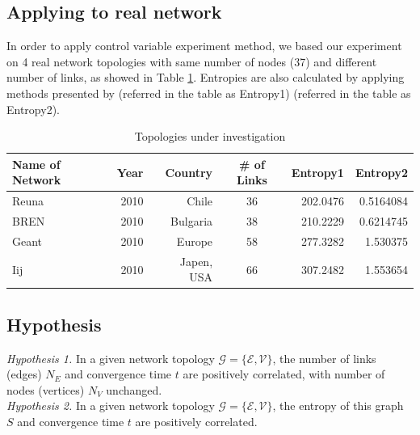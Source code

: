 \subsection{Applying to real network}
In order to apply control variable experiment method, we based our experiment on 4 real network topologies with same number of nodes (37) and different number of links, as showed in Table \ref{table: network}. Entropies are also calculated by applying methods presented by \cite{entropy1} (referred in the table as Entropy1) \cite{entropy2} (referred in the table as Entropy2).

\begin{table}
\centering
\begin{tabular}{lrrcrr}
	\hline
	Name of Network & Year & Country & \# of Links & Entropy1 & Entropy2\\
    \hline
    Reuna & 2010 & Chile & 36 & 202.0476 & 0.5164084\\
    BREN & 2010 & Bulgaria & 38 & 210.2229 & 0.6214745\\
    Geant & 2010 & Europe & 58 & 277.3282 & 1.530375\\
    Iij & 2010 & Japen, USA & 66 & 307.2482 & 1.553654\\
    \hline
\end{tabular}
\caption{Topologies under investigation}
\label{table: network}
\end{table}

\subsection{Hypothesis}
{\it Hypothesis 1.} In a given network topology $\mathcal{G}=\{\mathcal{E}, \mathcal{V}\}$, the number of links (edges) $N_E$ and convergence time $t$ are positively correlated, with number of nodes (vertices) $N_V$ unchanged.\\
{\it Hypothesis 2.} In a given network topology $\mathcal{G}=\{\mathcal{E}, \mathcal{V}\}$, the entropy of this graph $S$ and convergence time $t$ are positively correlated.

